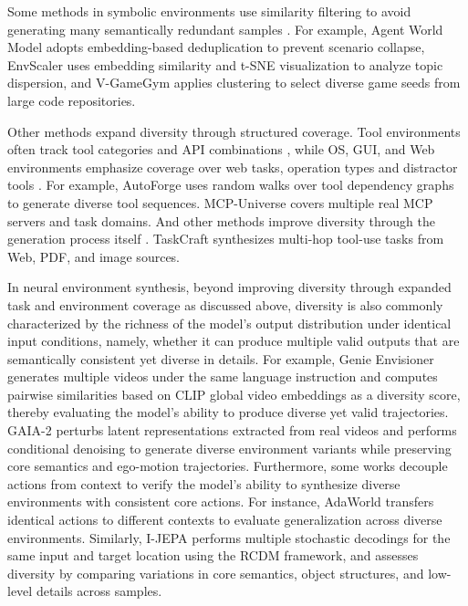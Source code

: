 \documentclass{llmxive}
\begin{document}
Some methods in symbolic environments use similarity filtering to avoid generating many semantically redundant samples \cite{InfiniteWeb}. For example, Agent World Model \cite{Agent_world_model} adopts embedding-based deduplication to prevent scenario collapse, EnvScaler \cite{EnvScaler} uses embedding similarity and t-SNE visualization to analyze topic dispersion, and V-GameGym \cite{V-GameGym} applies clustering to select diverse game seeds from large code repositories.

Other methods expand diversity through structured coverage. Tool environments often track tool categories and API combinations \cite{ToolBench, API-Bank}, while OS, GUI, and Web environments emphasize coverage over web tasks, operation types and distractor tools \cite{Mind2Web, WebArena, Mobile-Env}. For example, AutoForge \cite{AutoForge} uses random walks over tool dependency graphs to generate diverse tool sequences. MCP-Universe \cite{MCP-Universe} covers multiple real MCP servers and task domains. And other methods improve diversity through the generation process itself \cite{AgentBench, AI_GAMESTORE}. TaskCraft \cite{TaskCraft} synthesizes multi-hop tool-use tasks from Web, PDF, and image sources.

In neural environment synthesis, beyond improving diversity through expanded task and environment coverage as discussed above, diversity is also commonly characterized by the richness of the model’s output distribution under identical input conditions, namely, whether it can produce multiple valid outputs that are semantically consistent yet diverse in details. For example, Genie Envisioner \cite{Genie_Envisioner} generates multiple videos under the same language instruction and computes pairwise similarities based on CLIP global video embeddings as a diversity score, thereby evaluating the model’s ability to produce diverse yet valid trajectories. GAIA-2 \cite{GAIA-2} perturbs latent representations extracted from real videos and performs conditional denoising to generate diverse environment variants while preserving core semantics and ego-motion trajectories. Furthermore, some works decouple actions from context to verify the model's ability to synthesize diverse environments with consistent core actions. For instance, AdaWorld \cite{AdaWorld} transfers identical actions to different contexts to evaluate generalization across diverse environments. Similarly, I-JEPA \cite{I-JEPA} performs multiple stochastic decodings for the same input and target location using the RCDM framework, and assesses diversity by comparing variations in core semantics, object structures, and low-level details across samples.
\end{document}
